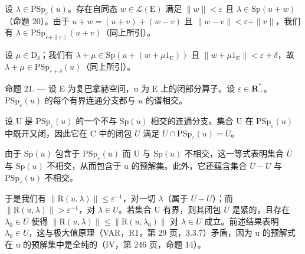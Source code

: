 设 \(\lambda \in \mathrm{PSp}_{\varepsilon}(u)\)。存在自同态 \(w \in \mathcal{L}(\mathrm{E})\) 满足 \(\|w\| < \varepsilon\) 且 \(\lambda \in \mathrm{Sp}(u+w)\)（命题 20）。由于 \(u+w = (u+v)+(w-v)\) 且 \(\|w-v\| < \varepsilon + \|v\|\)，我们有 \(\lambda \in \mathrm{PSp}_{\varepsilon+ \|v\|}(u+v)\)（同上所引）。

设 \(\mu \in \mathrm{D}_{\delta}\)；我们有 \(\lambda + \mu \in \mathrm{Sp}(u + (w + \mu 1_{\mathrm{E}}))\) 且 \(\| w + \mu 1_{\mathrm{E}} \| < \varepsilon + \delta\)，故 \(\lambda + \mu \in \mathrm{PSp}_{\varepsilon + \delta}(u)\)（同上所引）。

命题 21. --- 设 E 为复巴拿赫空间，u 为 E 上的闭部分算子。设 \(\varepsilon\in\mathbf{R}_{+}^{*}\)。\(\mathrm{PSp}_{\varepsilon}(u)\) 的每个有界连通分支都与 \(u\) 的谱相交。

设 U 是 \(\mathrm{PSp}_{\varepsilon}(u)\) 的一个不与 \(\mathrm{Sp}(u)\) 相交的连通分支。集合 U 在 \(\mathrm{PSp}_{\varepsilon}(u)\) 中既开又闭，因此它在 C 中的闭包 \(\overline{U}\) 满足 \(\overline{U} \cap \mathrm{PSp}_{\varepsilon}(u) = U\)。

由于 \(\mathrm{Sp}(u)\) 包含于 \(\mathrm{PSp}_{\varepsilon}(u)\) 而 U 与 \(\mathrm{Sp}(u)\) 不相交，这一等式表明集合 \(\overline{U}\) 与 \(\mathrm{Sp}(u)\) 不相交，从而包含于 u 的预解集。此外，它还蕴含集合 \(\overline{U}-U\) 与 \(\mathrm{PSp}_{\varepsilon}(u)\) 不相交。

于是我们有 \(\|\mathrm{R}(u,\lambda)\| \leqslant \varepsilon^{-1}\)，对一切 \(\lambda\)（属于 \(\overline{U} - U\)）；而 \(\|\mathrm{R}(u,\lambda)\| > \varepsilon^{-1}\)，对 \(\lambda \in U\)。若集合 U 有界，则其闭包 \(\overline{U}\) 是紧的，且存在 \(\lambda_{0} \in \overline{U}\) 使得 \(\|\mathrm{R}(u,\lambda)\| \leqslant \|\mathrm{R}(u,\lambda_{0})\|\) 对 \(\lambda \in \overline{U}\) 成立。前述结果表明 \(\lambda_{0} \in U\)，这与极大值原理（VAR，R1，第 29 页，3.3.7）矛盾，因为 u 的预解式在 u 的预解集中是全纯的（IV，第 246 页，命题 14）。

